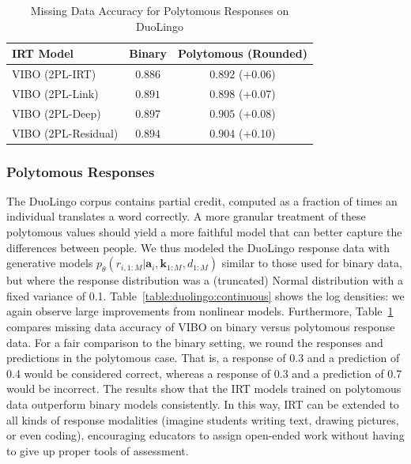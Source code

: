 \begin{table}[h!]
    \caption{Missing Data Accuracy for Polytomous Responses on DuoLingo}
    \label{table:duolingo:polytomous}
    \begin{center}
        \begin{tabular}{lcc}
        \hline
        IRT Model & Binary & Polytomous (Rounded) \\
        \hline
        VIBO (2PL-IRT) & $0.886$ & $0.892$ \small{(+0.06)} \\
        VIBO (2PL-Link) & $0.891$ & $0.898$ \small{(+0.07)} \\
        VIBO (2PL-Deep) & $\mathbf{0.897}$ & $\mathbf{0.905}$ \small{(+0.08)} \\
        VIBO (2PL-Residual) & $0.894$ & $0.904$ \small{(+0.10)} \\
        \hline
        \end{tabular}
        \end{center}
\end{table}

\subsubsection{Polytomous Responses}
\label{sec:polytomous}
The DuoLingo corpus contains partial credit, computed as a fraction of times an individual translates a word correctly.
A more granular treatment of these polytomous values should yield a more faithful model that can better capture the differences between people.
We thus modeled the DuoLingo response data with generative models $p_\theta({r}_{i,1:M}|\textbf{a}_i, \textbf{k}_{1:M}, d_{1:M})$ similar to those used for binary data, but where the response distribution was a (truncated) Normal distribution with a fixed variance of 0.1. 
Table~\ref{table:duolingo:continuous} shows the log densities: we again observe large improvements from nonlinear models.
Furthermore, Table~\ref{table:duolingo:polytomous} compares missing data accuracy of VIBO on binary versus polytomous response data. For a fair comparison to the binary setting, we round the responses and predictions in the polytomous case. That is, a response of 0.3 and a prediction of 0.4 would be considered correct, whereas a response of 0.3 and a prediction of 0.7 would be incorrect. The results show that the IRT models trained on polytomous data outperform binary models consistently.
In this way, IRT can be extended to all kinds of response modalities (imagine students writing text, drawing pictures, or even coding), encouraging educators to assign open-ended work without having to give up proper tools of assessment.

